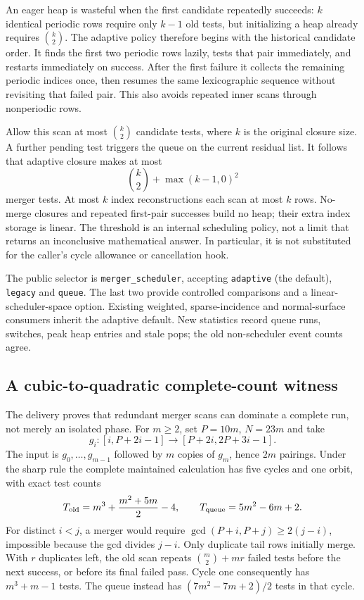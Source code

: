 An eager heap is wasteful when the first candidate repeatedly succeeds: $k$
identical periodic rows require only $k-1$ old tests, but initializing a heap
already requires $\binom{k}{2}$. The adaptive policy therefore begins with
the historical candidate order. It finds the first two periodic rows lazily,
tests that pair immediately, and restarts immediately on success. After the
first failure it collects the remaining periodic indices once, then resumes
the same lexicographic sequence without revisiting that failed pair. This
also avoids repeated inner scans through nonperiodic rows.

Allow this scan at most $\binom{k}{2}$ candidate tests, where $k$ is the
original closure size. A further pending test triggers the queue on the
current residual list. It follows that adaptive closure makes at most
\[
 \binom{k}{2}+\max(k-1,0)^2
\]
merger tests. At most $k$ index reconstructions each scan at most $k$ rows.
No-merge closures and repeated first-pair successes build no heap; their extra
index storage is linear. The threshold is an internal scheduling policy,
not a limit that returns an inconclusive mathematical answer. In particular,
it is not substituted for the caller's cycle allowance or cancellation hook.

The public selector is \texttt{merger\_scheduler}, accepting
\texttt{adaptive} (the default), \texttt{legacy} and \texttt{queue}.
The last two provide controlled comparisons and a linear-scheduler-space
option. Existing weighted, sparse-incidence and normal-surface consumers
inherit the adaptive default. New statistics record queue runs, switches,
peak heap entries and stale pops; the old non-scheduler event counts agree.

\subsection{A cubic-to-quadratic complete-count witness}

The delivery proves that redundant merger scans can dominate a complete run,
not merely an isolated phase. For $m\ge2$, set $P=10m$, $N=23m$ and take
\[
 g_i:[i,P+2i-1]\longrightarrow[P+2i,2P+3i-1].
\]
The input is $g_0,\ldots,g_{m-1}$ followed by $m$ copies of $g_m$, hence
$2m$ pairings. Under the sharp rule the complete maintained calculation has
five cycles and one orbit, with exact test counts
\[
 T_{\rm old}=m^3+\frac{m^2+5m}{2}-4,\qquad
 T_{\rm queue}=5m^2-6m+2.
\]
For distinct $i<j$, a merger would require
$\gcd(P+i,P+j)\ge2(j-i)$, impossible because the gcd divides $j-i$.
Only duplicate tail rows initially merge. With $r$ duplicates left, the old
scan repeats $\binom m2+mr$ failed tests before the next success, or before
its final failed pass. Cycle one consequently has $m^3+m-1$ tests. The
queue instead has $(7m^2-7m+2)/2$ tests in that cycle.


